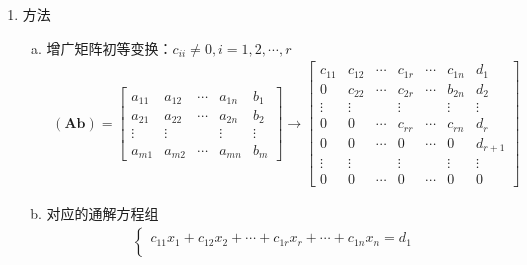 \documentclass[12pt]{book}
\begin{document}
\begin{enumerate}[1.]
\begin{enumerate}[(1)]
\begin{enumerate}[a.]
                    \end{enumerate}
              \item 方法
                    \begin{enumerate}[a.]
                        \item 增广矩阵初等变换：$c_{ii}\neq 0, i=1,2,\cdots,r$
                              \begin{gather*}
                                  (\mathbf{A}\mathbf{b}) = \begin{bmatrix}
                                      a_{11} & a_{12} & \cdots & a_{1n} & b_{1}  \\
                                      a_{21} & a_{22} & \cdots & a_{2n} & b_{2}  \\
                                      \vdots & \vdots &        & \vdots & \vdots \\
                                      a_{m1} & a_{m2} & \cdots & a_{mn} & b_{m}
                                  \end{bmatrix}
                                  \rightarrow \begin{bmatrix}
                                      c_{11} & c_{12} & \cdots & c_{1r} & \cdots & c_{1n} & d_{1}   \\
                                      0      & c_{22} & \cdots & c_{2r} & \cdots & b_{2n} & d_{2}   \\
                                      \vdots & \vdots &        & \vdots &        & \vdots & \vdots  \\
                                      0      & 0      & \cdots & c_{rr} & \cdots & c_{rn} & d_{r}   \\
                                      0      & 0      & \cdots & 0      & \cdots & 0      & d_{r+1} \\
                                      \vdots & \vdots &        & \vdots &        & \vdots & \vdots  \\
                                      0      & 0      & \cdots & 0      & \cdots & 0      & 0
                                  \end{bmatrix}
                              \end{gather*}
                        \item 对应的通解方程组
                              \begin{gather*}\left\{
                                  \begin{align*}
                                      c_{11} x_{1} + c_{12} x_{2} + \cdots + c_{1r} x_{r} + \cdots + c_{1n} x_{n} = d_{1} \\

\end{align*}
\end{gather*}
\end{enumerate}
\end{enumerate}
\end{enumerate}
\end{document}
